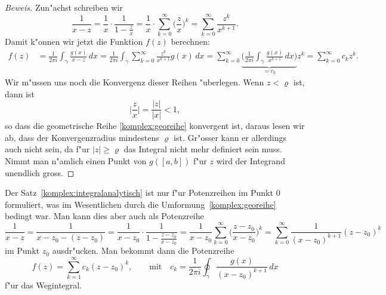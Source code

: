 \begin{proof}[Beweis]
Zun"achst schreiben wir
\begin{equation}
\frac{1}{x-z}
=
\frac1x\cdot \frac{1}{1-\displaystyle\frac{z}{x}}
=
\frac1x\cdot \sum_{k=0}^\infty \biggl(\frac{z}{x}\biggr)^k
=
\sum_{k=0}^\infty \frac{z^k}{x^{k+1}}.
\label{komplex:georeihe}
\end{equation}
Damit k"onnen wir jetzt die Funktion $f(z)$ berechnen:
\begin{align*}
f(z)
&=
\frac1{2\pi i} \int_{\gamma} \frac{g(x)}{x-z}\,dx
=
\frac1{2\pi i} \int_{\gamma} \sum_{k=0}^\infty \frac{z^k}{x^{k+1}}g(x)\,dx
=
\sum_{k=0}^\infty
\underbrace{\biggl(\frac1{2\pi i} \int_{\gamma} \frac{g(x)}{x^{k+1}}\,dx\biggr)}_{\displaystyle =c_k}
z^k
=
\sum_{k=0}^\infty c_kz^k.
\end{align*}
Wir m"ussen uns noch die Konvergenz dieser Reihen "uberlegen.
Wenn $z<\varrho$ ist, dann ist 
\[
\biggl|\frac{z}{x}\biggr| 
=
\frac{|z|}{|x|}
<1,
\]
so dass die geometrische Reihe \eqref{komplex:georeihe} konvergent ist,
daraus lesen wir ab, dass der Konvergenzradius mindestens $\varrho$
ist.
Gr"osser kann er allerdings auch nicht sein, da f"ur $|z|\ge \varrho$
das Integral nicht mehr definiert sein muss.
Nimmt man n"amlich einen Punkt von $g([a,b])$ f"ur $z$ wird der Integrand
unendlich gross.
\end{proof}

Der Satz~\ref{komplex:integralanalytisch} ist nur f"ur Potenzreihen
im Punkt $0$ formuliert, was im Wesentlichen durch die
Umformung~\eqref{komplex:georeihe} bedingt war.
Man kann dies aber auch als Potenzreihe
\[
\frac1{x-z}
=
\frac1{x-z_0-(z-z_0)}
=
\frac1{x-z_0}\cdot\frac1{1-\displaystyle\frac{z-z_0}{x-z_0}}
=
\frac1{x-z_0}\sum_{k=0}^\infty\biggl(\frac{z-z_0}{x-z_0}\biggr)^k
=
\sum_{k=0}^\infty\frac1{(x-z_0)^{k+1}}(z-z_0)^k
\]
im Punkt $z_0$ ausdr"ucken.
Man bekommt dann die Potenzreihe
\[
f(z) = \sum_{k=1}^\infty c_k(z-z_0)^k,\qquad
\text{mit}\quad
c_k=\frac1{2\pi i}\oint_\gamma\frac{g(x)}{(x-z_0)^{k+1}}\,dx
\]
f"ur das Wegintegral.

